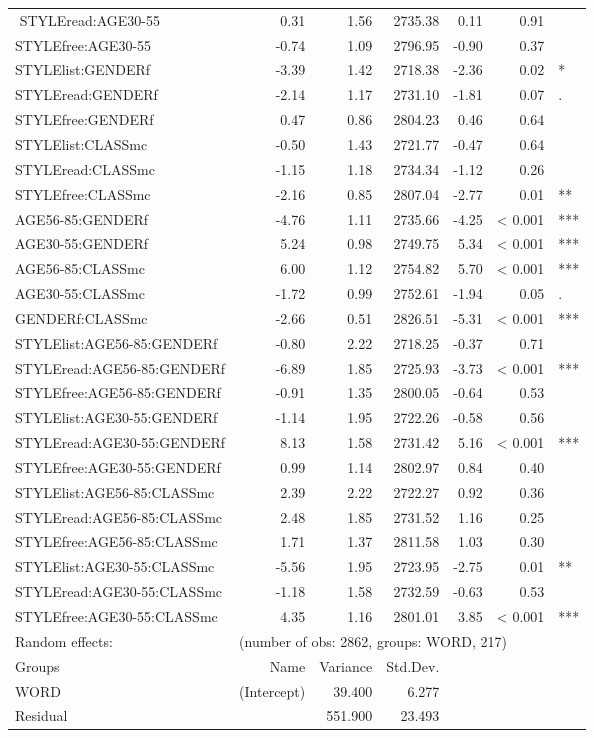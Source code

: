 {\begin{longtable}[c]{p{}rrrrrl}
$$		STYLEread:AGE30-55 & 0.31 & 1.56 & 2735.38 & 0.11 & 0.91 & \\ 
		STYLEfree:AGE30-55 & -0.74 & 1.09 & 2796.95 & -0.90 & 0.37 & \\ 
		STYLElist:GENDERf & -3.39 & 1.42 & 2718.38 & -2.36 & 0.02 & * \\ 
		STYLEread:GENDERf & -2.14 & 1.17 & 2731.10 & -1.81 & 0.07 & . \\ 
		STYLEfree:GENDERf & 0.47 & 0.86 & 2804.23 & 0.46 & 0.64 & \\ 
		STYLElist:CLASSmc & -0.50 & 1.43 & 2721.77 & -0.47 & 0.64 & \\ 
		STYLEread:CLASSmc & -1.15 & 1.18 & 2734.34 & -1.12 & 0.26 & \\ 
		STYLEfree:CLASSmc & -2.16 & 0.85 & 2807.04 & -2.77 & 0.01 & ** \\ 
		AGE56-85:GENDERf & -4.76 & 1.11 & 2735.66 & -4.25 & < 0.001 & *** \\ 
		AGE30-55:GENDERf & 5.24 & 0.98 & 2749.75 & 5.34 & < 0.001 & *** \\ 
		AGE56-85:CLASSmc & 6.00 & 1.12 & 2754.82 & 5.70 & < 0.001 & *** \\ 
		AGE30-55:CLASSmc & -1.72 & 0.99 & 2752.61 & -1.94 & 0.05 & . \\ 
		GENDERf:CLASSmc & -2.66 & 0.51 & 2826.51 & -5.31 & < 0.001 & *** \\ 
		STYLElist:AGE56-85:GENDERf & -0.80 & 2.22 & 2718.25 & -0.37 & 0.71 & \\ 
		STYLEread:AGE56-85:GENDERf & -6.89 & 1.85 & 2725.93 & -3.73 & < 0.001 & *** \\ 
		STYLEfree:AGE56-85:GENDERf & -0.91 & 1.35 & 2800.05 & -0.64 & 0.53 & \\ 
		STYLElist:AGE30-55:GENDERf & -1.14 & 1.95 & 2722.26 & -0.58 & 0.56 & \\ 
		STYLEread:AGE30-55:GENDERf & 8.13 & 1.58 & 2731.42 & 5.16 & < 0.001 & *** \\ 
		STYLEfree:AGE30-55:GENDERf & 0.99 & 1.14 & 2802.97 & 0.84 & 0.40 & \\ 
		STYLElist:AGE56-85:CLASSmc & 2.39 & 2.22 & 2722.27 & 0.92 & 0.36 & \\ 
		STYLEread:AGE56-85:CLASSmc & 2.48 & 1.85 & 2731.52 & 1.16 & 0.25 & \\ 
		STYLEfree:AGE56-85:CLASSmc & 1.71 & 1.37 & 2811.58 & 1.03 & 0.30 & \\ 
		STYLElist:AGE30-55:CLASSmc & -5.56 & 1.95 & 2723.95 & -2.75 & 0.01 & ** \\ 
		STYLEread:AGE30-55:CLASSmc & -1.18 & 1.58 & 2732.59 & -0.63 & 0.53 & \\ 
		STYLEfree:AGE30-55:CLASSmc & 4.35 & 1.16 & 2801.01 & 3.85 & < 0.001 & *** \\
		\hline
		Random effects: & \multicolumn{6}{l}{(number of obs: 2862, groups: WORD, 217)} \\
		Groups &         Name & Variance &      Std.Dev. & & & \\
		WORD &  (Intercept) & 39.400 & 6.277 & & & \\
		Residual  &         & 551.900 & 23.493 & & & \\
		\hline
	\end{longtable}
}

